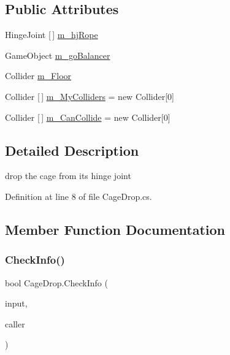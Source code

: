 \subsection*{Public Attributes}
\begin{DoxyCompactItemize}
\item 
Hinge\+Joint \mbox{[}$\,$\mbox{]} \mbox{\hyperlink{class_cage_drop_a0de7acd4bc329164d0d5c05f45ad7306}{m\+\_\+hj\+Rope}}
\item 
Game\+Object \mbox{\hyperlink{class_cage_drop_a5f17536752f100ab73e38f65ab377006}{m\+\_\+go\+Balancer}}
\item 
Collider \mbox{\hyperlink{class_cage_drop_ada79b293aef9836e982707e48d6fb0b2}{m\+\_\+\+Floor}}
\item 
Collider \mbox{[}$\,$\mbox{]} \mbox{\hyperlink{class_cage_drop_aff9e0ceae69798752d6fd61ac27263a0}{m\+\_\+\+My\+Colliders}} = new Collider\mbox{[}0\mbox{]}
\item 
Collider \mbox{[}$\,$\mbox{]} \mbox{\hyperlink{class_cage_drop_a4a078e929ab43f3ceed60383dcb6a02c}{m\+\_\+\+Can\+Collide}} = new Collider\mbox{[}0\mbox{]}
\end{DoxyCompactItemize}


\subsection{Detailed Description}
drop the cage from its hinge joint 



Definition at line 8 of file Cage\+Drop.\+cs.



\subsection{Member Function Documentation}
\mbox{\label{class_cage_drop_a38a96e29aa7e79a26f97e0ddf6480b2e}} 
\subsubsection{\texorpdfstring{Check\+Info()}{CheckInfo()}}
{\footnotesize\ttfamily bool Cage\+Drop.\+Check\+Info (\begin{DoxyParamCaption}\item[{Input\+Control}]{input,  }\item[{\mbox{\hyperlink{class_animal}{Animal}}}]{caller }\end{DoxyParamCaption})}



